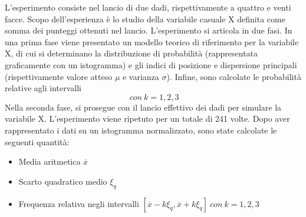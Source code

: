 L'esperimento consiste nel lancio di due dadi, rispettivamente a quattro e venti facce. Scopo dell'esperienza è lo studio della variabile casuale X definita come somma dei punteggi ottenuti nel lancio. L'esperimento si articola in due fasi. In una prima fase viene presentato un modello teorico di riferimento per la variabile X, di cui si determinano la distribuzione di probabilità (rappresentata graficamente con un istogramma) e gli indici di posizione e dispersione principali (rispettivamente valore atteso $\mu$ e varianza $\sigma$). Infine, sono calcolate le probabilità relative agli intervalli
\begin{equation}
	[\mu-k\sigma, \mu+k\sigma]\ con\ k=1,2,3
\end{equation} 
Nella seconda fase, si prosegue con il lancio effettivo dei dadi per simulare la variabile X. L'esperimento viene ripetuto per un totale di 241 volte. Dopo aver rappresentato i dati su un istogramma normalizzato, sono state calcolate le seguenti quantità:
\begin{itemize}
	\item Media aritmetica $\overline{x}$ 
	\item Scarto quadratico medio $\xi_q$
	\item Frequenza relativa negli intervalli $[\overline{x}-k\xi_q, \overline{x}+k\xi_q]\ con\ k=1,2,3$
\end{itemize}